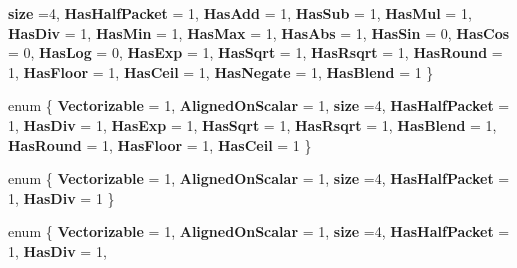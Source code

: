 \begin{DoxyCompactItemize}
{\bfseries size} =4, 
{\bfseries Has\+Half\+Packet} = 1, 
\newline
{\bfseries Has\+Add} = 1, 
{\bfseries Has\+Sub} = 1, 
{\bfseries Has\+Mul} = 1, 
{\bfseries Has\+Div} = 1, 
\newline
{\bfseries Has\+Min} = 1, 
{\bfseries Has\+Max} = 1, 
{\bfseries Has\+Abs} = 1, 
{\bfseries Has\+Sin} = 0, 
\newline
{\bfseries Has\+Cos} = 0, 
{\bfseries Has\+Log} = 0, 
{\bfseries Has\+Exp} = 1, 
{\bfseries Has\+Sqrt} = 1, 
\newline
{\bfseries Has\+Rsqrt} = 1, 
{\bfseries Has\+Round} = 1, 
{\bfseries Has\+Floor} = 1, 
{\bfseries Has\+Ceil} = 1, 
\newline
{\bfseries Has\+Negate} = 1, 
{\bfseries Has\+Blend} = 1
 \}
\item 
\mbox{\label{struct_eigen_1_1internal_1_1packet__traits_3_01double_01_4_a1c3c5fc2beddef09b601c24bff82ec39}} 
enum \{ \newline
{\bfseries Vectorizable} = 1, 
{\bfseries Aligned\+On\+Scalar} = 1, 
{\bfseries size} =4, 
{\bfseries Has\+Half\+Packet} = 1, 
\newline
{\bfseries Has\+Div} = 1, 
{\bfseries Has\+Exp} = 1, 
{\bfseries Has\+Sqrt} = 1, 
{\bfseries Has\+Rsqrt} = 1, 
\newline
{\bfseries Has\+Blend} = 1, 
{\bfseries Has\+Round} = 1, 
{\bfseries Has\+Floor} = 1, 
{\bfseries Has\+Ceil} = 1
 \}
\item 
\mbox{\label{struct_eigen_1_1internal_1_1packet__traits_3_01double_01_4_ab3833f902b313a62e0ebee99e56e4456}} 
enum \{ \newline
{\bfseries Vectorizable} = 1, 
{\bfseries Aligned\+On\+Scalar} = 1, 
{\bfseries size} =4, 
{\bfseries Has\+Half\+Packet} = 1, 
\newline
{\bfseries Has\+Div} = 1
 \}
\item 
\mbox{\label{struct_eigen_1_1internal_1_1packet__traits_3_01double_01_4_ae891f999b93cdedc2af985e7ae2b1c8d}} 
enum \{ \newline
{\bfseries Vectorizable} = 1, 
{\bfseries Aligned\+On\+Scalar} = 1, 
{\bfseries size} =4, 
{\bfseries Has\+Half\+Packet} = 1, 
\newline
{\bfseries Has\+Div} = 1, 

\end{DoxyCompactItemize}
